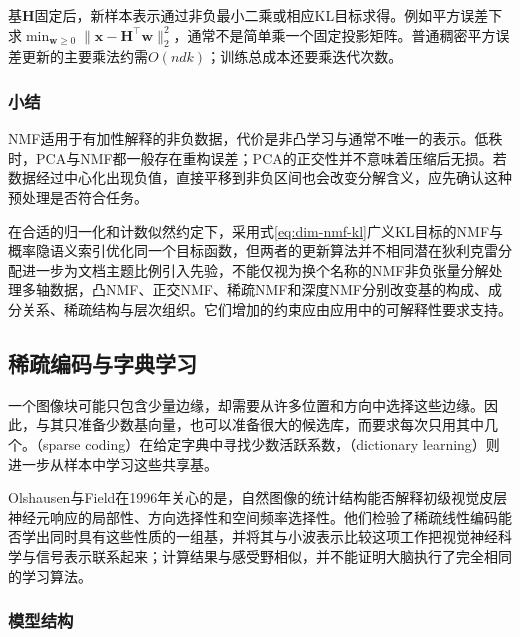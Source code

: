基$\bm{H}$固定后，新样本表示通过非负最小二乘或相应KL目标求得。例如平方误差下求$\min_{\bm{w}\geq0}\lVert\bm{x}-\bm{H}^{\top}\bm{w}\rVert_2^2$，通常不是简单乘一个固定投影矩阵。普通稠密平方误差更新的主要乘法约需$O(ndk)$；训练总成本还要乘迭代次数。

\subsubsection{小结}
\label{sec:dim-nmf-summary}

NMF适用于有加性解释的非负数据，代价是非凸学习与通常不唯一的表示。低秩时，PCA与NMF都一般存在重构误差；PCA的正交性并不意味着压缩后无损。若数据经过中心化出现负值，直接平移到非负区间也会改变分解含义，应先确认这种预处理是否符合任务。

在合适的归一化和计数似然约定下，采用式\eqref{eq:dim-nmf-kl}广义KL目标的NMF与概率隐语义索引优化同一个目标函数，但两者的更新算法并不相同潜在狄利克雷分配进一步为文档主题比例引入先验，不能仅视为换个名称的NMF非负张量分解处理多轴数据，凸NMF、正交NMF、稀疏NMF和深度NMF分别改变基的构成、成分关系、稀疏结构与层次组织。它们增加的约束应由应用中的可解释性要求支持。

\subsection{稀疏编码与字典学习}
\label{sec:dim-sparse-coding}

一个图像块可能只包含少量边缘，却需要从许多位置和方向中选择这些边缘。因此，与其只准备少数基向量，也可以准备很大的候选库，而要求每次只用其中几个。（sparse coding）在给定字典中寻找少数活跃系数，（dictionary learning）则进一步从样本中学习这些共享基。

Olshausen与Field在1996年关心的是，自然图像的统计结构能否解释初级视觉皮层神经元响应的局部性、方向选择性和空间频率选择性。他们检验了稀疏线性编码能否学出同时具有这些性质的一组基，并将其与小波表示比较这项工作把视觉神经科学与信号表示联系起来；计算结果与感受野相似，并不能证明大脑执行了完全相同的学习算法。

\subsubsection{模型结构}
\label{sec:dim-sparse-coding-structure}

